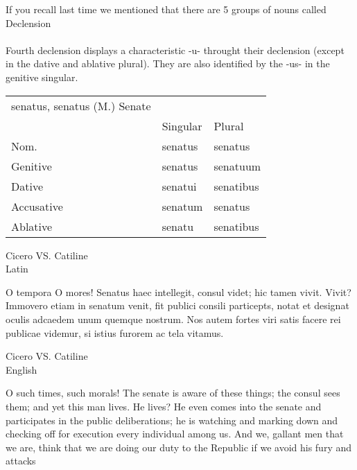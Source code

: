 If you recall last time we mentioned that there are 5 groups
of nouns called Declension \\ \\ 
Fourth declension displays a characteristic -u- throught 
their declension (except in the dative and ablative plural).
They are also identified by the -us- in the genitive singular.
\begin{center}  
  \begin{tabular}{lll}
    senatus, senatus (M.) Senate  \\
    & Singular & Plural \\ 
    Nom. & senatus & senatus \\ 
    Genitive & senatus & senatuum \\ 
    Dative & senatui & senatibus \\ 
    Accusative & senatum & senatus \\ 
    Ablative & senatu & senatibus 
  \end{tabular}

\end{center}
\begin{center}
  \huge Cicero VS. Catiline \\ Latin
\end{center}
O tempora O mores! Senatus haec intellegit, consul videt; hic
tamen vivit. Vivit? Immovero etiam in senatum venit, fit publici
consili particepts, notat et designat oculis adcaedem unum quemque
nostrum. Nos autem fortes viri satis facere rei publicae videmur,
si istius furorem ac tela vitamus.
\begin{center}
  \huge Cicero VS. Catiline \\ English
\end{center}
O such times, such morals! The senate is aware of these things;
the consul sees them; and yet this man lives. He lives? He even 
comes into the senate and participates in the public deliberations; 
he is watching and marking down and checking off for execution 
every individual among us. And we, gallant men that we are, think that 
we are doing our duty to the Republic if we avoid his fury and attacks
